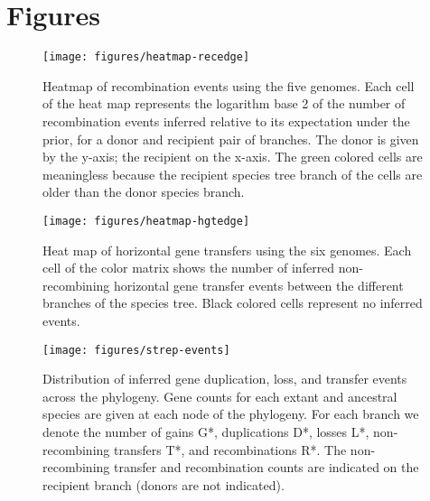 \documentclass[english]{article}
\begin{document}
\section*{Figures\clearpage{}}

\begin{figure}
\texttt{[image: figures/heatmap-recedge]}
\caption{\label{fig:Heatmap-of-recombination}Heatmap of recombination events
using the five genomes.  Each cell of the heat map represents the logarithm base
2 of the number of recombination events inferred relative to its expectation
under the prior, for a donor and recipient pair of branches. The donor is given by
the y-axis; the recipient on the x-axis.  The green colored cells are meaningless
because the recipient species tree branch of the cells are older than the donor
species branch.}
\end{figure}
\clearpage{}

\begin{figure}
\begin{center}
\texttt{[image: figures/heatmap-hgtedge]}
\end{center}
\caption{\label{fig:hgt-heatmap}Heat map of horizontal gene transfers using the
six genomes.
Each cell of the color matrix shows the number of inferred non-recombining
horizontal gene transfer events between the different branches of the species
tree. Black colored cells represent no inferred events.}
\end{figure}
\clearpage{}%

\begin{figure}
\texttt{[image: figures/strep-events]}
\caption{\label{fig:Gene-duplication-loss} Distribution of inferred gene
duplication, loss, and transfer events across the phylogeny.  Gene counts for
each extant and ancestral species are given at each node of the phylogeny.  For
each branch we denote the number of gains G*, duplications D*, losses L*,
non-recombining transfers T*, and recombinations R*.  The non-recombining
transfer and recombination counts are indicated on the recipient branch (donors
are not indicated).}
\end{figure}
\clearpage{}%
\end{document}
